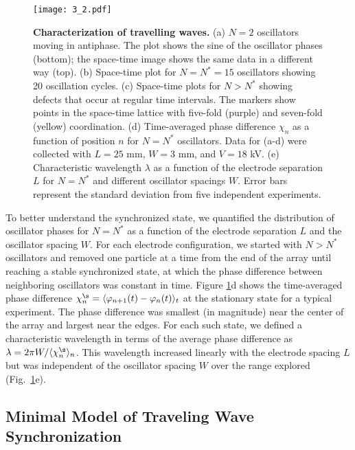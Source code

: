 \begin{figure}[p!]
    \centering
    \texttt{[image: 3\_2.pdf]}
    \caption{\textbf{Characterization of travelling waves.} (a) $N=2$ oscillators moving in antiphase. The plot shows the sine of the oscillator phases (bottom); the space-time image shows the same data in a different way (top). (b) Space-time plot for $N=N^*=15$ oscillators showing 20 oscillation cycles. (c) Space-time plots for $N>N^*$ showing defects that occur at regular time intervals. The markers show points in the space-time lattice with five-fold (purple) and seven-fold (yellow) coordination. (d) Time-averaged phase difference $\chi_n$ as a function of position $n$ for $N=N^*$ oscillators. Data for (a-d) were collected with $L=25$ mm, $W=3$ mm, and $V=18$ kV.  (e) Characteristic wavelength $\lambda$ as a function of the electrode separation $L$ for $N=N^*$ and different oscillator spacings $W$. Error bars represent the standard deviation from five independent experiments.}
    \label{fig:2}
\end{figure}

To better understand the synchronized state, we quantified the distribution of oscillator phases for $N = N^*$ as a function of the electrode separation $L$ and the oscillator spacing $W$. For each electrode configuration, we started with $N>N^*$ oscillators and removed one particle at a time from the end of the array until reaching a stable synchronized state, at which the phase difference between neighboring oscillators was constant in time. Figure \ref{fig:2}d shows the time-averaged phase difference $\chi^{\s}_n = \langle \varphi_{n+1}(t) - \varphi_n(t) \rangle_t$ at the stationary state for a typical experiment. The phase difference was smallest (in magnitude) near the center of the array and largest near the edges. For each such state, we defined a characteristic wavelength in terms of the average phase difference as $\lambda = 2\pi W / \langle \chi_n^{\s} \rangle_n$. This wavelength increased linearly with the electrode spacing $L$ but was independent of the oscillator spacing $W$ over the range explored (Fig.~\ref{fig:2}e).

\subsection{Minimal Model of Traveling Wave Synchronization}

